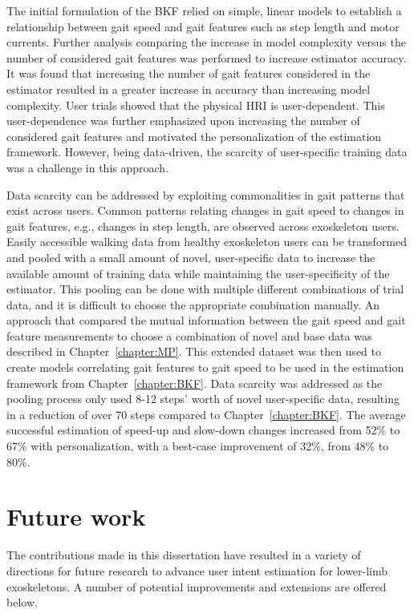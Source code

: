 The initial formulation of the BKF relied on simple, linear models to establish a relationship between gait speed and gait features such as step length and motor currents. Further analysis comparing the increase in model complexity versus the number of considered gait features was performed to increase estimator accuracy. It was found that increasing the number of gait features considered in the estimator resulted in a greater increase in accuracy than increasing model complexity. User trials showed that the physical HRI is user-dependent. This user-dependence was further emphasized upon increasing the number of considered gait features and motivated the personalization of the estimation framework. However, being data-driven, the scarcity of user-specific training data was a challenge in this approach. 

Data scarcity can be addressed by exploiting commonalities in gait patterns that exist across users. Common patterns relating changes in gait speed to changes in gait features, e.g., changes in step length, are observed across exoskeleton users. Easily accessible walking data from healthy exoskeleton users can be transformed and pooled with a small amount of novel, user-specific data to increase the available amount of training data while maintaining the user-specificity of the estimator. This pooling can be done with multiple different combinations of trial data, and it is difficult to choose the appropriate combination manually. An approach that compared the mutual information between the gait speed and gait feature measurements to choose a combination of novel and base data was described in Chapter~\ref{chapter:MP}. This extended dataset was then used to create models correlating gait features to gait speed to be used in the estimation framework from Chapter~\ref{chapter:BKF}. Data scarcity was addressed as the pooling process only used 8-12 steps' worth of novel user-specific data, resulting in a reduction of over 70 steps compared to Chapter~\ref{chapter:BKF}. The average successful estimation of speed-up and slow-down changes increased from 52\% to 67\% with personalization, with a best-case improvement of 32\%, from 48\% to 80\%. 

\section{Future work}

The contributions made in this dissertation have resulted in a variety of directions for future research to advance user intent estimation for lower-limb exoskeletons. A number of potential improvements and extensions are offered below.

